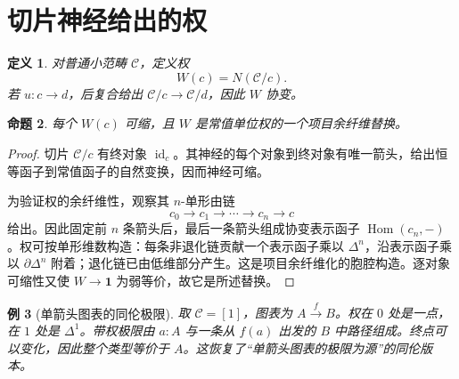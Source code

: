 \documentclass[12pt,oneside,openany,fontset=none]{ctexbook}
\theoremstyle{cn}
\newtheorem{definition}{定义}[chapter]
\newtheorem{example}[definition]{例}
\newtheorem{proposition}[definition]{命题}
\numberwithin{equation}{chapter}
\newcommand{\id}{\operatorname{id}}
\newcommand{\Hom}{\operatorname{Hom}}
\newcommand{\one}{\mathbf 1}
\begin{document}
\section{切片神经给出的权}
\begin{definition}
对普通小范畴 $\mathcal C$，定义权
\[
W(c)=N(\mathcal C/c).
\]
若 $u:c\to d$，后复合给出 $\mathcal C/c\to\mathcal C/d$，因此 $W$ 协变。
\end{definition}
\begin{proposition}
每个 $W(c)$ 可缩，且 $W$ 是常值单位权的一个项目余纤维替换。
\end{proposition}
\begin{proof}
切片 $\mathcal C/c$ 有终对象 $\id_c$。其神经的每个对象到终对象有唯一箭头，给出恒等函子到常值函子的自然变换，因而神经可缩。

为验证权的余纤维性，观察其 $n$-单形由链
\[
c_0\to c_1\to\cdots\to c_n\to c
\]
给出。因此固定前 $n$ 条箭头后，最后一条箭头组成协变表示函子 $\Hom(c_n,-)$。权可按单形维数构造：每条非退化链贡献一个表示函子乘以 $\Delta^n$，沿表示函子乘以 $\partial\Delta^n$ 附着；退化链已由低维部分产生。这是项目余纤维化的胞腔构造。逐对象可缩性又使 $W\to\one$ 为弱等价，故它是所述替换。
\end{proof}
\begin{example}[单箭头图表的同伦极限]
取 $\mathcal C=[1]$，图表为 $A\xrightarrow fB$。权在 $0$ 处是一点，在 $1$ 处是 $\Delta^1$。带权极限由 $a:A$ 与一条从 $f(a)$ 出发的 $B$ 中路径组成。终点可以变化，因此整个类型等价于 $A$。这恢复了“单箭头图表的极限为源”的同伦版本。
\end{example}
\end{document}
